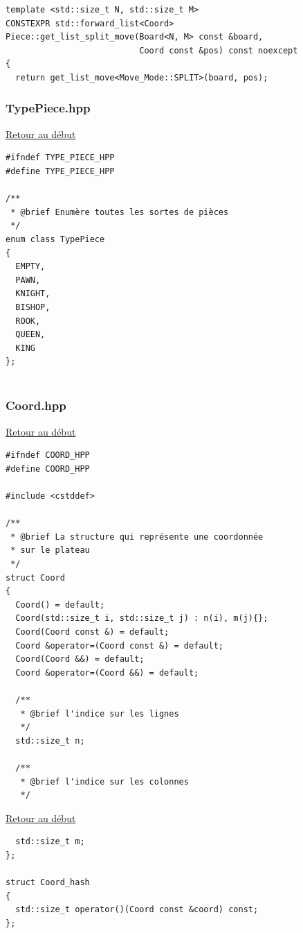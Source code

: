 {\begin{frame}[fragile]
\begin{verbatim}
template <std::size_t N, std::size_t M>
CONSTEXPR std::forward_list<Coord>
Piece::get_list_split_move(Board<N, M> const &board,
                           Coord const &pos) const noexcept
{
  return get_list_move<Move_Mode::SPLIT>(board, pos);

\end{verbatim}
\end{frame}

\begin{frame}[fragile]
\label{TypePiece.hpp}
\frametitle{TypePiece.hpp}
\hyperlink{conclusion}{Retour au début}\newline
\begin{verbatim}
#ifndef TYPE_PIECE_HPP
#define TYPE_PIECE_HPP

/**
 * @brief Enumère toutes les sortes de pièces
 */
enum class TypePiece
{
  EMPTY,
  PAWN,
  KNIGHT,
  BISHOP,
  ROOK,
  QUEEN,
  KING
};


\end{verbatim}
\end{frame}

\begin{frame}[fragile]
\label{Coord.hpp}
\frametitle{Coord.hpp}
\hyperlink{conclusion}{Retour au début}\newline
\begin{verbatim}
#ifndef COORD_HPP
#define COORD_HPP

#include <cstddef>

/**
 * @brief La structure qui représente une coordonnée
 * sur le plateau
 */
struct Coord
{
  Coord() = default;
  Coord(std::size_t i, std::size_t j) : n(i), m(j){};
  Coord(Coord const &) = default;
  Coord &operator=(Coord const &) = default;
  Coord(Coord &&) = default;
  Coord &operator=(Coord &&) = default;

  /**
   * @brief l'indice sur les lignes
   */
  std::size_t n;

  /**
   * @brief l'indice sur les colonnes
   */
\end{verbatim}
\end{frame}

\begin{frame}[fragile]
\hyperlink{conclusion}{Retour au début}\newline
\begin{verbatim}
  std::size_t m;
};

struct Coord_hash
{
  std::size_t operator()(Coord const &coord) const;
};


\end{verbatim}
\end{frame}}

